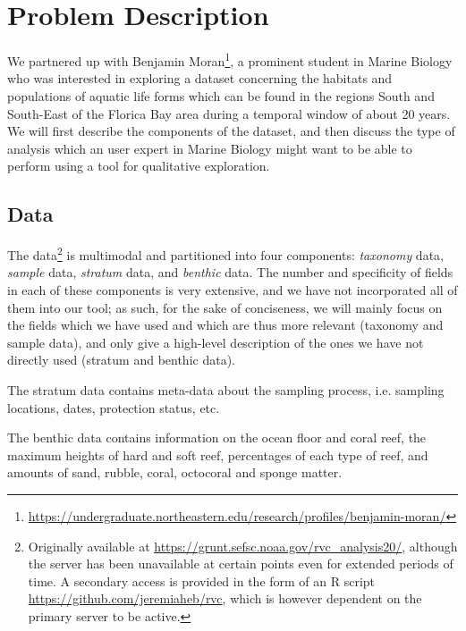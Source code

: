 \documentclass[letterpaper]{article} %
\begin{document}
\section{Problem Description}

We partnered up with Benjamin
Moran\footnote{\url{https://undergraduate.northeastern.edu/research/profiles/benjamin-moran/}},
a prominent student in Marine Biology who was interested in exploring a dataset
concerning the habitats and populations of aquatic life forms which can be
found in the regions South and South-East of the Florica Bay area during
a temporal window of about 20 years.  We will first describe the components of
the dataset, and then discuss the type of analysis which an user expert in
Marine Biology might want to be able to perform using a tool for qualitative
exploration.

\subsection{Data}


The data\footnote{Originally available at
  \url{https://grunt.sefsc.noaa.gov/rvc_analysis20/}, although the server has
  been unavailable at certain points even for extended periods of time.
  A secondary access is provided in the form of an R script
\url{https://github.com/jeremiaheb/rvc}, which is however dependent on the
primary server to be active.} is multimodal and partitioned into four
components: \emph{taxonomy} data, \emph{sample} data, \emph{stratum} data, and
\emph{benthic} data.  The number and specificity of fields in each of these
components is very extensive, and we have not incorporated all of them into our
tool;  as such, for the sake of conciseness, we will mainly focus on the fields
which we have used and which are thus more relevant (taxonomy and sample data),
and only give a high-level description of the ones we have not directly used
(stratum and benthic data).

The stratum data contains meta-data about the sampling process, i.e. sampling
locations, dates, protection status, etc.

The benthic data contains information on the ocean floor and coral
reef, the maximum heights of hard and soft reef, percentages of each type of
reef, and amounts of sand, rubble, coral, octocoral and sponge matter.
\end{document}
